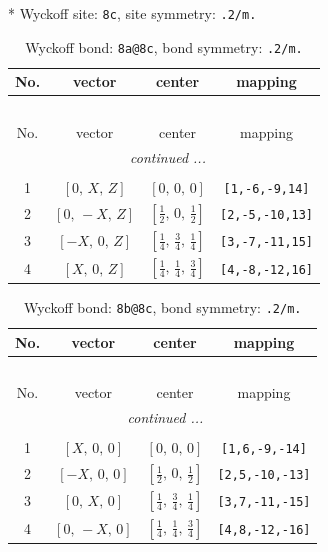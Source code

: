 \documentclass[fleqn,8pt]{jsarticle}
\begin{document}
* Wyckoff site: {\tt 8c}, site symmetry: {\tt .2/m.}
\renewcommand{\arraystretch}{1.2}
\begin{longtable}{cccc}
\caption{Wyckoff bond: {\tt 8a@8c}, bond symmetry: {\tt .2/m.}}
 \\
 \hline \hline
No. & vector & center & mapping \\ \hline \endfirsthead

\multicolumn{3}{l}{\tablename\ \thetable{}} \\
 \hline \hline
No. & vector & center & mapping \\ \hline \endhead

 \hline \hline
\multicolumn{3}{r}{\footnotesize\it continued ...} \\ \endfoot

 \hline \hline
\multicolumn{3}{r}{} \\ \endlastfoot

1 & $\left[ 0,\, X,\, Z \right]$ & $\left[ 0,\, 0,\, 0 \right]$ & {\tt [1,-6,-9,14]} \\ \hline
2 & $\left[ 0,\, - X,\, Z \right]$ & $\left[ \frac{1}{2},\, 0,\, \frac{1}{2} \right]$ & {\tt [2,-5,-10,13]} \\ \hline
3 & $\left[ - X,\, 0,\, Z \right]$ & $\left[ \frac{1}{4},\, \frac{3}{4},\, \frac{1}{4} \right]$ & {\tt [3,-7,-11,15]} \\ \hline
4 & $\left[ X,\, 0,\, Z \right]$ & $\left[ \frac{1}{4},\, \frac{1}{4},\, \frac{3}{4} \right]$ & {\tt [4,-8,-12,16]} \\
\end{longtable}
\renewcommand{\arraystretch}{1.2}
\begin{longtable}{cccc}
\caption{Wyckoff bond: {\tt 8b@8c}, bond symmetry: {\tt .2/m.}}
 \\
 \hline \hline
No. & vector & center & mapping \\ \hline \endfirsthead

\multicolumn{3}{l}{\tablename\ \thetable{}} \\
 \hline \hline
No. & vector & center & mapping \\ \hline \endhead

 \hline \hline
\multicolumn{3}{r}{\footnotesize\it continued ...} \\ \endfoot

 \hline \hline
\multicolumn{3}{r}{} \\ \endlastfoot

1 & $\left[ X,\, 0,\, 0 \right]$ & $\left[ 0,\, 0,\, 0 \right]$ & {\tt [1,6,-9,-14]} \\ \hline
2 & $\left[ - X,\, 0,\, 0 \right]$ & $\left[ \frac{1}{2},\, 0,\, \frac{1}{2} \right]$ & {\tt [2,5,-10,-13]} \\ \hline
3 & $\left[ 0,\, X,\, 0 \right]$ & $\left[ \frac{1}{4},\, \frac{3}{4},\, \frac{1}{4} \right]$ & {\tt [3,7,-11,-15]} \\ \hline
4 & $\left[ 0,\, - X,\, 0 \right]$ & $\left[ \frac{1}{4},\, \frac{1}{4},\, \frac{3}{4} \right]$ & {\tt [4,8,-12,-16]} \\
\end{longtable}
\end{document}
